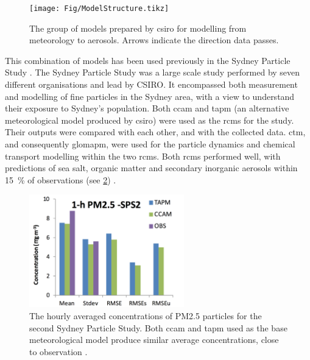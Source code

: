 	\begin{figure}[!htb]
	    \centering
	    \vspace*{5mm}
	    \texttt{[image: Fig/ModelStructure.tikz]}
	    \vspace*{5mm}
	    \caption{The group of models prepared by \gls{csiro} for modelling from meteorology to aerosols. Arrows indicate the direction data passes.}
	    \label{fig:modelstruct}
	\end{figure}

	This combination of models has been used previously in the Sydney Particle Study \citep{cope:2014tw}. The Sydney Particle Study was a large scale study performed by seven different organisations and lead by CSIRO. It encompassed both measurement and modelling of fine particles in the Sydney area, with a view to understand their exposure to Sydney's population. Both \gls{ccam} and \gls{tapm} (an alternative meteorological model produced by \gls{csiro}) were used as the \gls{rcm}s for the study. Their outputs were compared with each other, and with the collected data. \gls{ctm}, and consequently \gls{glomapm}, were used for the particle dynamics and chemical transport modelling within the two \gls{rcm}s. Both \gls{rcm}s performed well, with predictions of sea salt, organic matter and secondary inorganic aerosols within \SI{15}{\percent} of observations (see \cref{fig:sydpartdata}) \citep{cope:2014tw}.

	\begin{figure}[!htb]
	    \centering
	    \includegraphics[width=0.6\textwidth,natwidth=1308,natheight=952]{Fig/sydneyparticledata.png}
	    \caption{The hourly averaged concentrations of PM2.5 particles for the second Sydney Particle Study. Both \gls{ccam} and \gls{tapm} used as the base meteorological model produce similar average concentrations, close to observation \citep{cope:2014tw}.}
	    \label{fig:sydpartdata}
	\end{figure}




